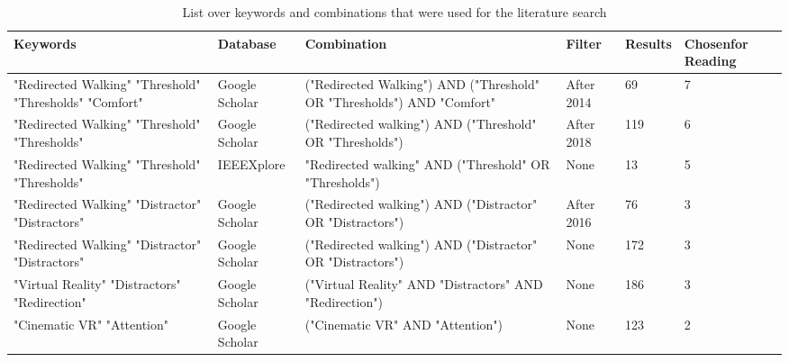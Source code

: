 \begin{table}[tbh!]
\centering
\begin{tabularx}{\textwidth}{|m{2cm}|m{1.7cm}|m{2.7cm}|m{1.5cm}|m{1.20cm}|m{3.375cm}|} 
\hline
Keywords & Database & Combination & Filter & Results & Chosen\newline for Reading\\ 
\hline
"Redirected Walking"\newline
"Threshold"\newline
"Thresholds"\newline
"Comfort"& Google Scholar & ("Redirected Walking") AND ("Threshold" OR "Thresholds") AND "Comfort" & After 2014 & 69 & 7\\ 
\hline
"Redirected Walking"\newline
"Threshold"\newline
"Thresholds" & Google Scholar & ("Redirected walking") AND ("Threshold" OR "Thresholds") & After 2018 & 119 & 6\\
\hline
"Redirected Walking"\newline
"Threshold"\newline
"Thresholds" & IEEEXplore & "Redirected walking" AND ("Threshold" OR "Thresholds") & None & 13 & 5\\ 
\hline
"Redirected Walking"\newline
"Distractor"\newline
"Distractors" & Google Scholar & ("Redirected walking") AND ("Distractor" OR "Distractors") & After 2016 & 76 & 3\\
\hline
"Redirected Walking"\newline
"Distractor"\newline
"Distractors" & Google Scholar & ("Redirected walking") AND ("Distractor" OR "Distractors") & None & 172 & 3\\
\hline
"Virtual Reality"\newline
"Distractors"\newline
"Redirection" & Google Scholar & ("Virtual Reality" AND "Distractors" AND "Redirection") & None & 186 & 3\\
\hline
"Cinematic VR"\newline
"Attention" & Google Scholar & ("Cinematic VR" AND "Attention") & None & 123 & 2\\
\hline
\end{tabularx}
\caption[Keywords and Combinations That Were Used for the Literature Search]{List over keywords and combinations that were used for the literature search}
\label{table:literaturekeywords}
\end{table}

